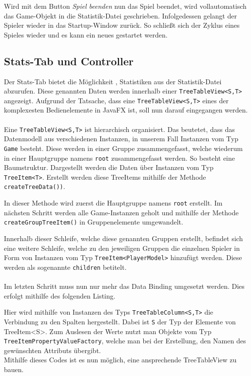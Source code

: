 Wird mit dem Button \textit{Spiel beenden} nun das Spiel beendet, wird vollautomatisch das Game-Objekt in die Statistik-Datei geschrieben.
Infolgedessen gelangt der Spieler wieder in das Startup-Window zurück.
So schließt sich der Zyklus eines Spieles wieder und es kann ein neues gestartet werden.
\subsection{\acs{Stats}-Tab und Controller}\label{sssec:statsController}
Der Stats-Tab bietet die Möglichkeit , Statistiken aus der Statistik-Datei abzurufen.
Diese genannten Daten werden innerhalb einer \lstinline[style=java]{TreeTableView<S,T>} angezeigt.
Aufgrund der Tatsache, dass eine \lstinline[style=java]{TreeTableView<S,T>} eines der komplexesten Bedienelemente in JavaFX ist, soll nun darauf eingegangen werden.\\\\
Eine \lstinline[style=java]{TreeTableView<S,T>} ist hierarchisch organisiert.
Das beutetet, dass das Datenmodell aus verschiedenen Instanzen, in unserem Fall Instanzen vom Typ \lstinline[style=java]{Game} besteht.
Diese werden in einer Gruppe zusammengefasst, welche wiederum in einer Hauptgruppe namens \lstinline[style=java]{root} zusammengefasst werden.
So besteht eine Baumstruktur.
Dargestellt werden die Daten über Instanzen vom Typ \lstinline[style=java]{TreeItem<T>}.
Erstellt werden diese TreeItems mithilfe der Methode \lstinline[style=java]{createTreeData())}.

In dieser Methode wird zuerst die Hauptgruppe namens \lstinline[style=java]{root} erstellt.
Im nächsten Schritt werden alle Game-Instanzen geholt und mithilfe der Methode \lstinline[style=java]{createGroupTreeItem()} in Gruppenelemente umgewandelt.

Innerhalb dieser Schleife, welche diese genannten Gruppen erstellt, befindet sich eine weitere Schleife, welche zu den jeweiligen Gruppen die einzelnen Spieler in Form von Instanzen vom Typ \lstinline[style=java]{TreeItem<PlayerModel>} hinzufügt werden.
Diese werden als sogenannte \lstinline[style=java]{children} betitelt.\\\\
Im letzten Schritt muss nun nur mehr das Data Binding umgesetzt werden.
Dies erfolgt mithilfe des folgenden Listing.

Hier wird mithilfe von Instanzen des Typs \lstinline[style=java]{TreeTableColumn<S,T>} die Verbindung zu den Spalten hergestellt.
Dabei ist \lstinline[style=java]{S} der Typ der Elemente von {TreeItem<S>}.
Zum Auslesen der Werte nutzt man Objekte vom Typ \lstinline[style=java]{TreeItemPropertyValueFactory}, welche man bei der Erstellung, den Namen des gewünschten Attributs übergibt.\\
Mithilfe dieses Codes ist es nun möglich, eine ansprechende TreeTableView zu bauen.
